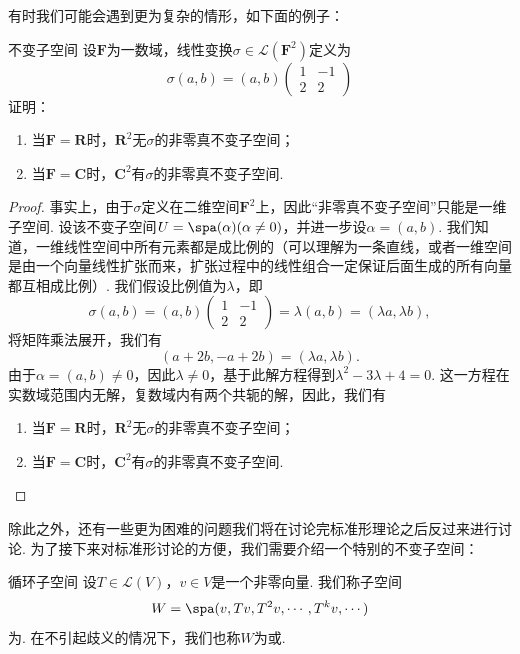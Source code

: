 有时我们可能会遇到更为复杂的情形，如下面的例子：
\begin{example}{}{不变子空间}
    设$\mathbf{F}$为一数域，线性变换$\sigma\in\mathcal{L}(\mathbf{F}^2)$定义为
    \[\sigma(a,b)=(a,b)\begin{pmatrix}
            1 & -1 \\ 2 & 2
        \end{pmatrix}\]
    证明：
    \begin{enumerate}
        \item 当$\mathbf{F}=\mathbf{R}$时，$\mathbf{R}^2$无$\sigma$的非零真不变子空间；

        \item 当$\mathbf{F}=\mathbf{C}$时，$\mathbf{C}^2$有$\sigma$的非零真不变子空间.
    \end{enumerate}
\end{example}

\begin{proof}
    事实上，由于$\sigma$定义在二维空间$\mathbf{F}^2$上，因此``非零真不变子空间''只能是一维子空间. 设该不变子空间$U=\spa(\alpha)(\alpha\neq 0)$，并进一步设$\alpha=(a,b)$. 我们知道，一维线性空间中所有元素都是成比例的（可以理解为一条直线，或者一维空间是由一个向量线性扩张而来，扩张过程中的线性组合一定保证后面生成的所有向量都互相成比例）. 我们假设比例值为$\lambda$，即
    \[\sigma(a,b)=(a,b)\begin{pmatrix}
            1 & -1 \\ 2 & 2
        \end{pmatrix}=\lambda(a,b)=(\lambda a,\lambda b),\]
    将矩阵乘法展开，我们有
    \[(a+2b,-a+2b)=(\lambda a,\lambda b).\]
    由于$\alpha=(a,b)\neq 0$，因此$\lambda\neq 0$，基于此解方程得到$\lambda^2-3\lambda+4=0$. 这一方程在实数域范围内无解，复数域内有两个共轭的解，因此，我们有
    \begin{enumerate}
        \item 当$\mathbf{F}=\mathbf{R}$时，$\mathbf{R}^2$无$\sigma$的非零真不变子空间；

        \item 当$\mathbf{F}=\mathbf{C}$时，$\mathbf{C}^2$有$\sigma$的非零真不变子空间.
    \end{enumerate}
\end{proof}

除此之外，还有一些更为困难的问题我们将在讨论完标准形理论之后反过来进行讨论. 为了接下来对标准形讨论的方便，我们需要介绍一个特别的不变子空间：
\begin{definition}{}{循环子空间}
    设$T\in\mathcal{L}(V)$，$v\in V$是一个非零向量. 我们称子空间
    \[W=\spa(v,Tv,T^2v,\cdots,T^kv,\cdots)\]
    为. 在不引起歧义的情况下，我们也称$W$为或.
\end{definition}

